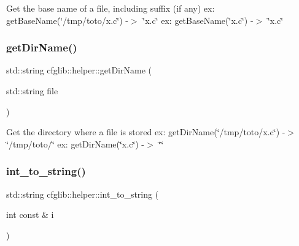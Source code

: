 Get the base name of a file, including suffix (if any) ex\+: get\+Base\+Name(\char`\"{}/tmp/toto/x.\+c\char`\"{}) -\/$>$ \char`\"{}x.\+c\char`\"{} ex\+: get\+Base\+Name(\char`\"{}x.\+c\char`\"{}) -\/$>$ \char`\"{}x.\+c\char`\"{} \mbox{\label{namespacecfglib_1_1helper_ab650f4d56d31c95fb20f656b620fecae}} 
\subsubsection{\texorpdfstring{get\+Dir\+Name()}{getDirName()}}
{\footnotesize\ttfamily std\+::string cfglib\+::helper\+::get\+Dir\+Name (\begin{DoxyParamCaption}\item[{std\+::string}]{file }\end{DoxyParamCaption})\hspace{0.3cm}{\ttfamily [inline]}}

Get the directory where a file is stored ex\+: get\+Dir\+Name(\char`\"{}/tmp/toto/x.\+c\char`\"{}) -\/$>$ \char`\"{}/tmp/toto/\char`\"{} ex\+: get\+Dir\+Name(\char`\"{}x.\+c\char`\"{}) -\/$>$ \char`\"{}\char`\"{} \mbox{\label{namespacecfglib_1_1helper_ae880d04f2f8ac3fecbda16531db992b5}} 
\subsubsection{\texorpdfstring{int\+\_\+to\+\_\+string()}{int\_to\_string()}}
{\footnotesize\ttfamily std\+::string cfglib\+::helper\+::int\+\_\+to\+\_\+string (\begin{DoxyParamCaption}\item[{int const \&}]{i }\end{DoxyParamCaption})\hspace{0.3cm}{\ttfamily [inline]}}

\mbox{\label{namespacecfglib_1_1helper_a15df8b46c248e364b8e4e522bfbde414}} 
